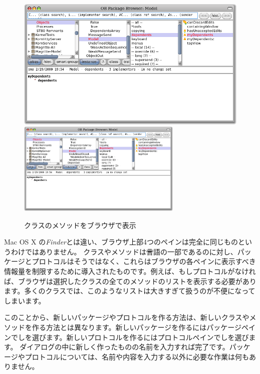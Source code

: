 \documentclass[a4paper,10pt,twoside]{book}
\begin{document}
\begin{figure}[htbp]
   \centering
   \ifluluelse
{\includegraphics[width=\textwidth]{SystemBrowserMyDependents}}
{\includegraphics[width=0.7\textwidth]{SystemBrowserMyDependents}}
   \caption{クラスのメソッドをブラウザで表示
   }
\end{figure}

Mac OS X の\emph{Finder}とは違い、ブラウザ上部4つのペインは完全に同じものというわけではありません。
クラスやメソッドは\st 言語の一部であるのに対し、パッケージとプロトコルはそうではなく、これらはブラウザの各ペインに表示すべき情報量を制限するために導入されたものです。例えば、もしプロトコルがなければ、ブラウザは選択したクラスの全てのメソッドのリストを表示する必要があります。多くのクラスでは、このようなリストは大きすぎて扱うのが不便になってしまいます。

このことから、新しいパッケージやプロトコルを作る方法は、新しいクラスやメソッドを作る方法とは異なります。新しいパッケージを作るにはパッケージペインで\actclick しを選びます。新しいプロトコルを作るにはプロトコルペインで\actclick しを選びます。
ダイアログの中に新しく作ったものの名前を入力すれば完了です。パッケージやプロトコルについては、名前や内容を入力する以外に必要な作業は何もありません。
\end{document}
